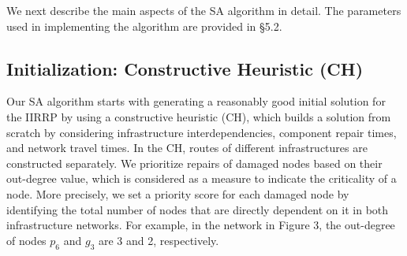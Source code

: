 \documentclass[11pt]{article}
\begin{document}
We next describe the main aspects of the SA algorithm in detail. The  parameters used in implementing the algorithm are provided in \S 5.2.


\subsection{Initialization: Constructive Heuristic (CH)}  \label{s:res1}

Our SA algorithm starts with generating a reasonably good initial solution for the IIRRP by using a constructive heuristic (CH), which builds a solution from scratch by considering infrastructure interdependencies, component repair times, and network travel times. In the CH, routes of different infrastructures are constructed separately. We prioritize repairs of damaged nodes based on their out-degree value, which is considered as a measure to indicate the criticality of a node. More precisely, we set a priority score for each damaged node by identifying the total number of nodes that are directly dependent on it in both infrastructure networks. For example, in the network in Figure 3, the out-degree of nodes $p_6$ and $g_3$ are 3 and 2, respectively.


\end{document}
